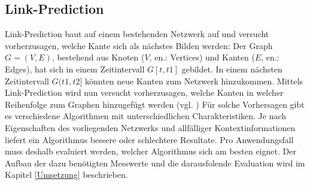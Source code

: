 \subsection{Link-Prediction}
Link-Prediction baut auf einem bestehenden Netzwerk auf und versucht vorherzusagen, welche Kante sich als nächstes Bilden werden:
Der Graph $G = (V, E)$, bestehend aus Knoten ($V$, en.: Vertices) und Kanten ($E$, en.: Edges), hat sich in einem Zeitintervall $G[t, t1]$ gebildet.
In einem nächsten Zeitintervall $G(t1, t2]$ könnten neue Kanten zum Netzwerk hinzukommen.
Mittels Link-Prediction wird nun versucht vorherzusagen, welche Kanten in welcher Reihenfolge zum Graphen hinzugefügt werden (vgl. \cite{gao_link_2015})
Für solche Vorhersagen gibt es verschiedene Algorithmen mit unterschiedlichen Charakteristiken.
Je nach Eigenschaften des vorliegenden Netzwerks und allfälliger Kontextinformationen liefert ein Algorithmus bessere oder schlechtere Resultate.
Pro Anwendungsfall muss deshalb evaluiert werden, welcher Algorithmus sich am besten eignet.
Der Aufbau der dazu benötigten Messwerte und die darausfolende Evaluation wird im Kapitel \ref{Umsetzung} beschrieben.
